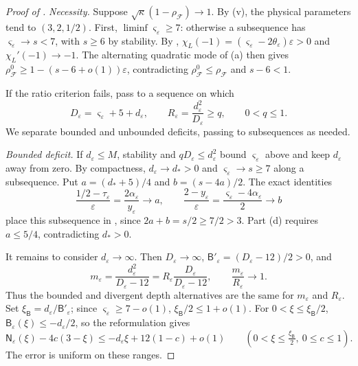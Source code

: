 \documentclass[11pt]{article}
\theoremstyle{definition}
\theoremstyle{remark}
\newcommand{\cF}{\mathcal F}
\newcommand{\rhoF}{\rho_{\cF}}
\newcommand{\rhoz}{\rho_{\cF}^{0}}
\begin{document}
\begin{proof}[Proof of ]
\emph{Necessity.}  Suppose \(\sqrt\kappa(1-\rhoF)\to1\).
By (v), the physical parameters tend to \((3,2,1/2)\).
First, \(\liminf\varsigma_\varepsilon\ge7\): otherwise a subsequence has
\(\varsigma_\varepsilon\to s<7\), with \(s\ge6\) by stability.
By ,
\(\chi_L(-1)=(\varsigma_\varepsilon-2\theta_\varepsilon)\varepsilon>0\) and
\(\chi_L'(-1)\to-1\).  The alternating quadratic mode of (a)
then gives \(\rhoz\ge1-(s-6+o(1))\varepsilon\), contradicting
\(\rhoz\le\rhoF\) and \(s-6<1\).

If the ratio criterion fails, pass to a sequence on which
\[
D_\varepsilon=\varsigma_\varepsilon+5+d_\varepsilon,
\qquad R_\varepsilon=\frac{d_\varepsilon^2}{D_\varepsilon}\ge q,
\qquad 0<q\le1.
\]
We separate bounded and unbounded deficits, passing to subsequences as needed.

\emph{Bounded deficit.}  If \(d_\varepsilon\le M\), stability and
\(qD_\varepsilon\le d_\varepsilon^2\) bound \(\varsigma_\varepsilon\) above
and keep \(d_\varepsilon\) away from zero.
By compactness, \(d_\varepsilon\to d_*>0\) and
\(\varsigma_\varepsilon\to s\ge7\) along a subsequence.  Put
\(a=(d_*+5)/4\) and \(b=(s-4a)/2\).
The exact identities
\[
\frac{1/2-\tau_\varepsilon}{\varepsilon}
=\frac{2\alpha_\varepsilon}{y_\varepsilon}\to a,
\qquad
\frac{2-y_\varepsilon}{\varepsilon}
=\frac{\varsigma_\varepsilon-4\alpha_\varepsilon}{2}\to b
\]
place this subsequence in , since
\(2a+b=s/2\ge7/2>3\).
Part (d) requires \(a\le5/4\), contradicting \(d_*>0\).

It remains to consider \(d_\varepsilon\to\infty\).
Then \(D_\varepsilon\to\infty\), \(\mathsf B'_\varepsilon=(D_\varepsilon-12)/2>0\), and
\[
m_\varepsilon=\frac{d_\varepsilon^2}{D_\varepsilon-12}
=R_\varepsilon\frac{D_\varepsilon}{D_\varepsilon-12},
\qquad \frac{m_\varepsilon}{R_\varepsilon}\to1.
\]
Thus the bounded and divergent depth alternatives are the same for
\(m_\varepsilon\) and \(R_\varepsilon\).
Set \(\xi_{\mathsf B}=d_\varepsilon/\mathsf B'_\varepsilon\);
since \(\varsigma_\varepsilon\ge7-o(1)\), \(\xi_{\mathsf B}/2\le1+o(1)\).
For \(0<\xi\le\xi_{\mathsf B}/2\),
\(\mathsf B_\varepsilon(\xi)\le-d_\varepsilon/2\), so the reformulation gives
\begin{equation}\label{eq:dip}
\mathsf N_\varepsilon(\xi)-4c(3-\xi)
\le-d_\varepsilon\xi+12(1-c)+o(1)
\qquad(0<\xi\le\tfrac{\xi_{\mathsf B}}2,\ 0\le c\le1).
\end{equation}
The error is uniform on these ranges.


\end{proof}
\end{document}
